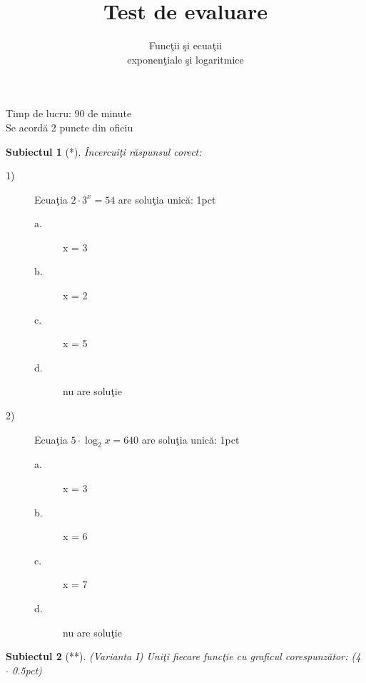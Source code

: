 \documentclass[a4paper, 12pt]{scrartcl}
\title{
    Test de evaluare
}
\subtitle{Func\c tii \c si ecua\c tii \\
exponen\c tiale \c si logaritmice}
\author{}
\date{}
\theoremstyle{plain}
\newtheorem{subiect}{Subiectul}
\newcommand{\Subiect}[2]{
    {
        \large
        \begin{subiect}[#2]
            #1
        \end{subiect}
    }
}
\begin{document}
\maketitle


\indent Timp de lucru: 90 de minute \\
\indent Se acord\u a 2 puncte din oficiu \\

\Subiect{\^ Incercui\c ti r\u aspunsul corect: \hfill}{*}

\begin{description}
    \item[1)] Ecua\c tia \(2 \cdot 3^x = 54 \) are solu\c tia unic\u a: \hfill 1pct
    {
        \begin{paracol}{3}
            \begin{description}
                \item[a.] x = 3 
                \item[b.] x = 2 
            \end{description}
            \switchcolumn
            \begin{description}
                \item[c.] x = 5
                \item[d.] nu are solu\c tie 
            \end{description}
            \switchcolumn
        \end{paracol}
    }
    \item[2)] Ecua\c tia \(5 \cdot \log_2{x} = 640 \) are solu\c tia unic\u a: \hfill 1pct
    {
        \begin{paracol}{3}
            \begin{description}
                \item[a.] x = 3 
                \item[b.] x = 6 
            \end{description}
            \switchcolumn
            \begin{description}
                \item[c.] x = 7
                \item[d.]nu are solu\c tie 
            \end{description}
            \switchcolumn
        \end{paracol}
    }
\end{description}

\newpage

\Subiect{(Varianta I) Uni\c ti fiecare func\c tie cu graficul corespunz\u ator: (4 \(\cdot\) 0.5pct) \hfill }{**}
\end{document}
